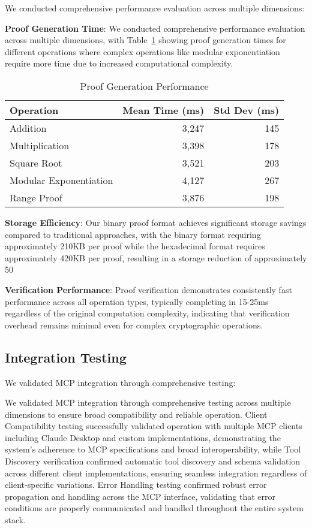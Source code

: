 \documentclass[11pt]{article}
\begin{document}
We conducted comprehensive performance evaluation across multiple dimensions:

\textbf{Proof Generation Time}: We conducted comprehensive performance evaluation across multiple dimensions, with Table~\ref{tab:performance} showing proof generation times for different operations where complex operations like modular exponentiation require more time due to increased computational complexity.

\begin{table}[ht]
\centering
\caption{Proof Generation Performance}
\label{tab:performance}
\begin{tabular}{lrr}
\toprule
Operation & Mean Time (ms) & Std Dev (ms) \\
\midrule
Addition & 3,247 & 145 \\
Multiplication & 3,398 & 178 \\
Square Root & 3,521 & 203 \\
Modular Exponentiation & 4,127 & 267 \\
Range Proof & 3,876 & 198 \\
\bottomrule
\end{tabular}
\end{table}

\textbf{Storage Efficiency}: Our binary proof format achieves significant storage savings compared to traditional approaches, with the binary format requiring approximately 210KB per proof while the hexadecimal format requires approximately 420KB per proof, resulting in a storage reduction of approximately 50%

\textbf{Verification Performance}: Proof verification demonstrates consistently fast performance across all operation types, typically completing in 15-25ms regardless of the original computation complexity, indicating that verification overhead remains minimal even for complex cryptographic operations.

\subsection{Integration Testing}

We validated MCP integration through comprehensive testing:

We validated MCP integration through comprehensive testing across multiple dimensions to ensure broad compatibility and reliable operation. Client Compatibility testing successfully validated operation with multiple MCP clients including Claude Desktop and custom implementations, demonstrating the system's adherence to MCP specifications and broad interoperability, while Tool Discovery verification confirmed automatic tool discovery and schema validation across different client implementations, ensuring seamless integration regardless of client-specific variations. Error Handling testing confirmed robust error propagation and handling across the MCP interface, validating that error conditions are properly communicated and handled throughout the entire system stack.
\end{document}
